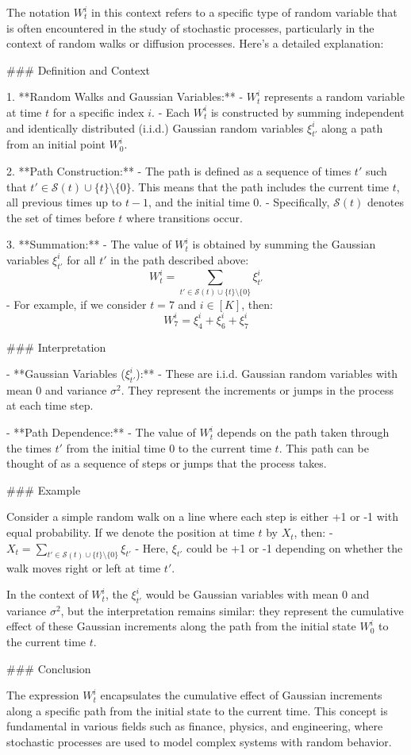 The notation \( W_t^i \) in this context refers to a specific type of random variable that is often encountered in the study of stochastic processes, particularly in the context of random walks or diffusion processes. Here's a detailed explanation:

### Definition and Context

1. **Random Walks and Gaussian Variables:**
   - \( W_t^i \) represents a random variable at time \( t \) for a specific index \( i \).
   - Each \( W_t^i \) is constructed by summing independent and identically distributed (i.i.d.) Gaussian random variables \( \xi_{t'}^i \) along a path from an initial point \( W_0^i \).

2. **Path Construction:**
   - The path is defined as a sequence of times \( t' \) such that \( t' \in \mathcal{S}(t) \cup \{t\} \setminus \{0\} \). This means that the path includes the current time \( t \), all previous times up to \( t-1 \), and the initial time 0.
   - Specifically, \( \mathcal{S}(t) \) denotes the set of times before \( t \) where transitions occur.

3. **Summation:**
   - The value of \( W_t^i \) is obtained by summing the Gaussian variables \( \xi_{t'}^i \) for all \( t' \) in the path described above:
     \[
     W_t^i = \sum_{t' \in \mathcal{S}(t) \cup \{t\} \setminus \{0\}} \xi_{t'}^i
     \]
   - For example, if we consider \( t = 7 \) and \( i \in [K] \), then:
     \[
     W_7^i = \xi_4^i + \xi_6^i + \xi_7^i
     \]

### Interpretation

- **Gaussian Variables (\( \xi_{t'}^i \)):**
  - These are i.i.d. Gaussian random variables with mean 0 and variance \( \sigma^2 \). They represent the increments or jumps in the process at each time step.
  
- **Path Dependence:**
  - The value of \( W_t^i \) depends on the path taken through the times \( t' \) from the initial time 0 to the current time \( t \). This path can be thought of as a sequence of steps or jumps that the process takes.

### Example

Consider a simple random walk on a line where each step is either +1 or -1 with equal probability. If we denote the position at time \( t \) by \( X_t \), then:
- \( X_t = \sum_{t' \in \mathcal{S}(t) \cup \{t\} \setminus \{0\}} \xi_{t'} \)
- Here, \( \xi_{t'} \) could be +1 or -1 depending on whether the walk moves right or left at time \( t' \).

In the context of \( W_t^i \), the \( \xi_{t'}^i \) would be Gaussian variables with mean 0 and variance \( \sigma^2 \), but the interpretation remains similar: they represent the cumulative effect of these Gaussian increments along the path from the initial state \( W_0^i \) to the current time \( t \).

### Conclusion

The expression \( W_t^i \) encapsulates the cumulative effect of Gaussian increments along a specific path from the initial state to the current time. This concept is fundamental in various fields such as finance, physics, and engineering, where stochastic processes are used to model complex systems with random behavior.